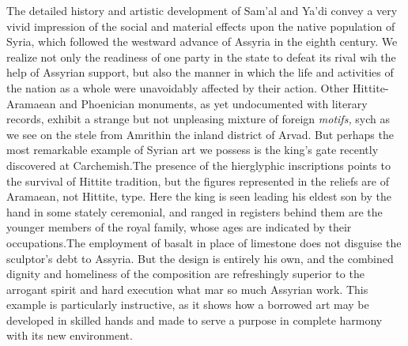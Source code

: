 \documentclass[12pt,oneside]{book}
\begin{document}
The detailed history and artistic development of Sam'al and Ya'di convey a very vivid impression of the social and material effects upon the native population of Syria, which followed the westward advance of Assyria in the eighth century. We realize not only the readiness of one party in the state to defeat its rival wih the help of Assyrian support, but also the manner in which the life and activities of the nation as a whole were unavoidably affected by their action. Other Hittite-Aramaean and Phoenician monuments, as yet undocumented with literary records, exhibit a strange but not unpleasing mixture of foreign \textit{motifs,} sych as we see on the stele from Amrith\footnotemark in the inland district of Arvad. But perhaps the most remarkable example of Syrian art we possess is the king's gate recently discovered at Carchemish.\footnotemark The presence of the hierglyphic inscriptions points to the survival of Hittite tradition, but the figures represented in the reliefs are of Aramaean, not Hittite, type. Here the king is seen leading his eldest son by the hand in some stately ceremonial, and ranged in registers behind them are the younger members of the royal family, whose ages are indicated by their occupations.\footnotemark The employment of basalt in place of limestone does not disguise the sculptor's debt to Assyria. But the design is entirely his own, and the combined dignity and homeliness of the composition are refreshingly superior to the arrogant spirit and hard execution what mar so much Assyrian work. This example is particularly instructive, as it shows how a borrowed art may be developed in skilled hands and made to serve a purpose in complete harmony with its new environment. \par 



\end{document}
